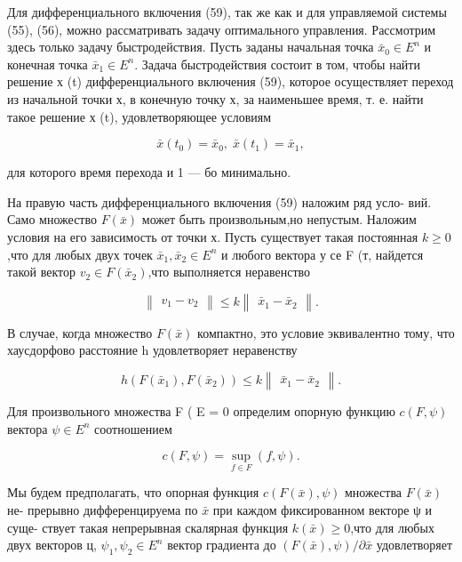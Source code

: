 \documentclass[10pt]{article}
\begin{document}
Для дифференциального включения (59), так же как и для управляемой системы (55), (56), можно рассматривать задачу оптимального управления. Рассмотрим здесь только задачу быстродействия. Пусть заданы начальная точка \({\bar{x}}_{0} \in  {E}^{n}\) и конечная точка \({\bar{x}}_{1} \in  {E}^{n}\). Задача быстродействия состоит в том, чтобы найти решение х (t) дифференциального включения (59), которое осуществляет переход из начальной точки х, в конечную точку х, за наименьшее время, т. е. найти такое решение х (t), удовлетворяющее условиям

\[
\bar{x}\left( {t}_{0}\right)  = {\bar{x}}_{0},\;\bar{x}\left( {t}_{1}\right)  = {\bar{x}}_{1},
\]

для которого время перехода и 1 — бо минимально.

На правую часть дифференциального включения (59) наложим ряд усло- вий. Само множество \(F\left( \bar{x}\right)\) может быть произвольным,но непустым. Наложим условия на его зависимость от точки х. Пусть существует такая постоянная \(k \geq  0\),что для любых двух точек \({\bar{x}}_{1},{\bar{x}}_{2} \in  {E}^{n}\) и любого вектора у се F (т, найдется такой вектор \({v}_{2} \in  F\left( {\bar{x}}_{2}\right)\),что выполняется неравенство

\[
\left\lVert \begin{array}{c} {{v}_{1} - {v}_{2}} \end{array} \right\rVert \leq  k\left\lVert \begin{array}{c} {{\bar{x}}_{1} - {\bar{x}}_{2}} \end{array} \right\rVert.
\]

В случае, когда множество \(F\left( \bar{x}\right)\) компактно, это условие эквивалентно тому, что хаусдорфово расстояние h удовлетворяет неравенству

\[
h\left( {F\left( {\bar{x}}_{1}\right),F\left( {\bar{x}}_{2}\right) }\right)  \leq  k\left\lVert \begin{array}{c} {{\bar{x}}_{1} - {\bar{x}}_{2}} \end{array} \right\rVert.
\]

Для произвольного множества F ( E = 0 определим опорную функцию \(c\left( {F,\psi }\right)\) вектора \(\psi  \in  {E}^{n}\) соотношением

\[
c\left( {F,\psi }\right)  = \mathop{\sup }\limits_{{f \in  F}}\left( {f,\psi }\right).
\]

Мы будем предполагать, что опорная функция \(c\left( {F\left( \bar{x}\right),\psi }\right)\) множества \(F\left( \bar{x}\right)\) не- прерывно дифференцируема по \(\bar{x}\) при каждом фиксированном векторе ψ и суще- ствует такая непрерывная скалярная функция \(k\left( \bar{x}\right)  \geq  0\),что для любых двух векторов ц, \({\psi }_{1},{\psi }_{2} \in  {E}^{n}\) вектор градиента до \(\left( {F\left( \bar{x}\right),\psi }\right) /\partial \bar{x}\) удовлетворяет
\end{document}
